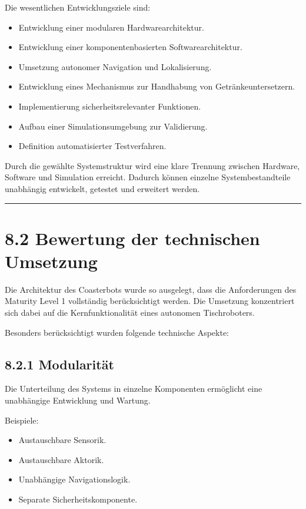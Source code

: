 \documentclass[
]{article}
\providecommand{\tightlist}{%
  \setlength{\itemsep}{0pt}\setlength{\parskip}{0pt}}
\begin{document}
Die wesentlichen Entwicklungsziele sind:

\begin{itemize}
\tightlist
\item
  Entwicklung einer modularen Hardwarearchitektur.
\item
  Entwicklung einer komponentenbasierten Softwarearchitektur.
\item
  Umsetzung autonomer Navigation und Lokalisierung.
\item
  Entwicklung eines Mechanismus zur Handhabung von Getränkeuntersetzern.
\item
  Implementierung sicherheitsrelevanter Funktionen.
\item
  Aufbau einer Simulationsumgebung zur Validierung.
\item
  Definition automatisierter Testverfahren.
\end{itemize}

Durch die gewählte Systemstruktur wird eine klare Trennung zwischen
Hardware, Software und Simulation erreicht. Dadurch können einzelne
Systembestandteile unabhängig entwickelt, getestet und erweitert werden.

\begin{center}\rule{0.5\linewidth}{0.5pt}\end{center}

\section{8.2 Bewertung der technischen
Umsetzung}\label{bewertung-der-technischen-umsetzung}

Die Architektur des Coasterbots wurde so ausgelegt, dass die
Anforderungen des Maturity Level 1 vollständig berücksichtigt werden.
Die Umsetzung konzentriert sich dabei auf die Kernfunktionalität eines
autonomen Tischroboters.

Besonders berücksichtigt wurden folgende technische Aspekte:

\subsection{8.2.1 Modularität}\label{modularituxe4t}

Die Unterteilung des Systems in einzelne Komponenten ermöglicht eine
unabhängige Entwicklung und Wartung.

Beispiele:

\begin{itemize}
\tightlist
\item
  Austauschbare Sensorik.
\item
  Austauschbare Aktorik.
\item
  Unabhängige Navigationslogik.
\item
  Separate Sicherheitskomponente.
\end{itemize}
\end{document}
